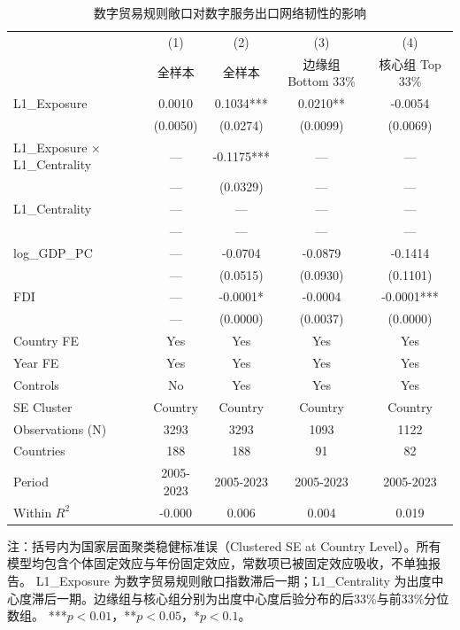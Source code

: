 \begin{table}[htbp]
\centering
\caption{数字贸易规则敞口对数字服务出口网络韧性的影响}
\label{tab:main_fe_resilience}
\small
\begin{tabular*}{14cm}{@{\extracolsep{\fill}}lcccc}
\toprule
 & (1) & (2) & (3) & (4) \\
 & 全样本 & 全样本 & 边缘组 Bottom 33\% & 核心组 Top 33\% \\
\midrule
L1_Exposure & 0.0010 & 0.1034*** & 0.0210** & -0.0054 \\
 & (0.0050) & (0.0274) & (0.0099) & (0.0069) \\
L1\_Exposure × L1\_Centrality & — & -0.1175*** & — & — \\
 & — & (0.0329) & — & — \\
L1_Centrality & — & — & — & — \\
 & — & — & — & — \\
log_GDP_PC & — & -0.0704 & -0.0879 & -0.1414 \\
 & — & (0.0515) & (0.0930) & (0.1101) \\
FDI & — & -0.0001* & -0.0004 & -0.0001*** \\
 & — & (0.0000) & (0.0037) & (0.0000) \\
Country FE & Yes & Yes & Yes & Yes \\
Year FE & Yes & Yes & Yes & Yes \\
Controls & No & Yes & Yes & Yes \\
SE Cluster & Country & Country & Country & Country \\
Observations (N) & 3293 & 3293 & 1093 & 1122 \\
Countries & 188 & 188 & 91 & 82 \\
Period & 2005-2023 & 2005-2023 & 2005-2023 & 2005-2023 \\
Within $R^2$ & -0.000 & 0.006 & 0.004 & 0.019 \\
\bottomrule
\end{tabular*}

\begin{flushleft}
\footnotesize 注：括号内为国家层面聚类稳健标准误（Clustered SE at Country Level）。所有模型均包含个体固定效应与年份固定效应，常数项已被固定效应吸收，不单独报告。
L1_Exposure 为数字贸易规则敞口指数滞后一期；L1_Centrality 为出度中心度滞后一期。边缘组与核心组分别为出度中心度后验分布的后33\%与前33\%分位数组。
***$p<0.01$，**$p<0.05$，*$p<0.1$。
\end{flushleft}
\end{table}